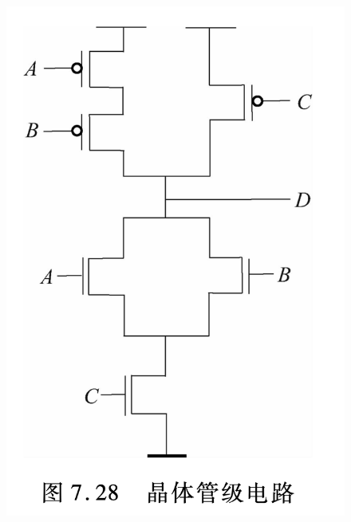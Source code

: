 \documentclass[10pt,a4paper,UTF8]{ctexart}
\begin{document}
\begin{figure}[H]
	\centering
	\includegraphics[scale=0.25]{img/7.2.png}
\end{figure}
\end{document}

